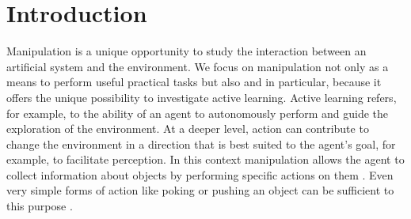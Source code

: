 \section{Introduction}
\label{sect:intro}
Manipulation is a unique opportunity to study the interaction between an artificial system and the environment. We focus on manipulation not only as a means to perform useful practical tasks but also and in particular, because it offers the unique possibility to investigate active learning. Active learning refers, for example, to the ability of an agent to autonomously perform and guide the exploration of the environment. At a deeper level, action can contribute to change the environment in a direction that is best suited to the agent's goal, for example, to facilitate perception. In this context manipulation allows the agent to collect information about objects by performing specific actions on them \cite{metta03early}. Even very simple forms of action like poking or pushing an object can be sufficient to this purpose \cite{fitzpatrick03learning}.

